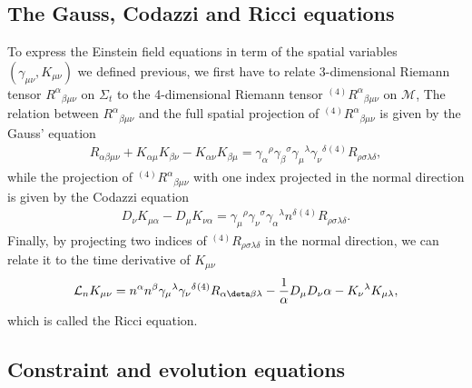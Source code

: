 \subsection{The Gauss, Codazzi and Ricci equations}
\label{section2.2.4}

To express the Einstein field equations in term of the spatial variables $(\gamma_{\mu\nu}, K_{\mu\nu})$ we defined previous,
we first have to relate 3-dimensional Riemann tensor $R^\alpha{}_{\beta\mu\nu}$ on $\Sigma_t$ to the 4-dimensional Riemann tensor ${}^{(4)}R^\alpha{}_{\beta\mu\nu}$ on $\mathcal{M}$,
The relation between $R^\alpha{}_{\beta\mu\nu}$ and the full spatial projection of ${}^{(4)}R^\alpha{}_{\beta\mu\nu}$ is given by the Gauss' equation
\begin{align}\label{eq:Gauss}
    R_{\alpha\beta\mu\nu} + K_{\alpha\mu}K_{\beta\nu} - K_{\alpha\nu} K_{\beta\mu} = \gamma_{\alpha}{}^{\rho} \gamma_{\beta}{}^{\sigma} \gamma_{\mu}{}^{\lambda} \gamma_{\nu}{}^{\delta} {}^{(4)}R_{\rho\sigma\lambda\delta},
\end{align}
while the projection of ${}^{(4)}R^\alpha{}_{\beta\mu\nu}$ with one index projected in the normal direction is given by the Codazzi equation
\begin{align}\label{eq:Codazzi}
    D_{\nu} K_{\mu\alpha} - D_{\mu} K_{\nu\alpha} = \gamma_{\mu}{}^{\rho} \gamma_{\nu}{}^{\sigma} \gamma_{\alpha}{}^{\lambda} n^{\delta} {}^{(4)}R_{\rho\sigma\lambda\delta}.
\end{align}
Finally, by projecting two indices of ${}^{(4)}R_{\rho\sigma\lambda\delta}$ in the normal direction,
we can relate it to the time derivative of $K_{\mu\nu}$
\begin{align}\label{eq:Ricci}
    \mathcal{L}_n K_{\mu\nu} = n^{\alpha} n^{\beta} \gamma_{\mu}{}^{\lambda} \gamma_{\nu}{}^{\delta} {}^{(4)}R_{\alpha\deta\beta\lambda} - \frac{1}{\alpha} D_{\mu} D_\nu \alpha - K_{\nu}{}^{\lambda}K_{\mu\lambda},
\end{align}
which is called the Ricci equation.

\subsection{Constraint and evolution equations} %
\label{section2.2.5}

